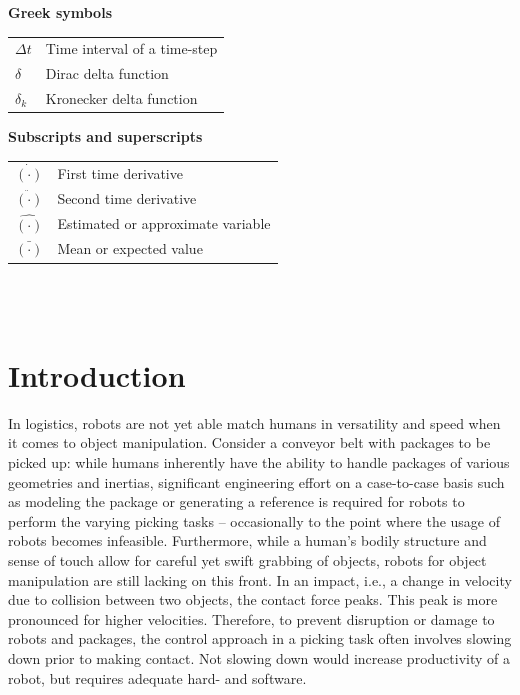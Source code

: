 \documentclass[11pt]{report}
\numberwithin{equation}{chapter}		%
\numberwithin{figure}{chapter}			%
\numberwithin{table}{chapter}			%
\begin{document}
	\vspace{0.5cm}
	\noindent\textbf{Greek symbols}\\[3mm]
	\begin{tabularx}{\textwidth}{p{2.5cm}X}
		$\Delta t$         & Time interval of a time-step                   \\
		$\delta$           & Dirac delta function                           \\
		$\delta_k$         & Kronecker delta function                       
	\end{tabularx}

	\vspace{0.5cm}
	\noindent\textbf{Subscripts and superscripts}\\[3mm]
	\begin{tabularx}{\textwidth}{p{2.5cm}X}
		$\dot{(\cdot)}$    & First time derivative                          \\
		$\ddot{(\cdot)}$   & Second time derivative                         \\
		$\hat{(\cdot)}$    & Estimated or approximate variable              \\
		$\bar{(\cdot)}$    & Mean or expected value                         
	\end{tabularx}\\


	\newpage
	\thispagestyle{empty} \ \newpage

	\chapter{Introduction} \label{ch:Intro}
	In logistics, robots are not yet able match humans in versatility and speed when it comes to object manipulation. Consider a conveyor belt with packages to be picked up: while humans inherently have the ability to handle packages of various geometries and inertias, significant engineering effort on a case-to-case basis such as modeling the package or generating a reference is required for robots to perform the varying picking tasks -- occasionally to the point where the usage of robots becomes infeasible. Furthermore, while a human's bodily structure and sense of touch allow for careful yet swift grabbing of objects, robots for object manipulation are still lacking on this front. In an impact, i.e., a change in velocity due to collision between two objects, the contact force peaks. This peak is more pronounced for higher velocities. Therefore, to prevent disruption or damage to robots and packages, the control approach in a picking task often involves slowing down prior to making contact. Not slowing down would increase productivity of a robot, but requires adequate hard- and software.
\end{document}

